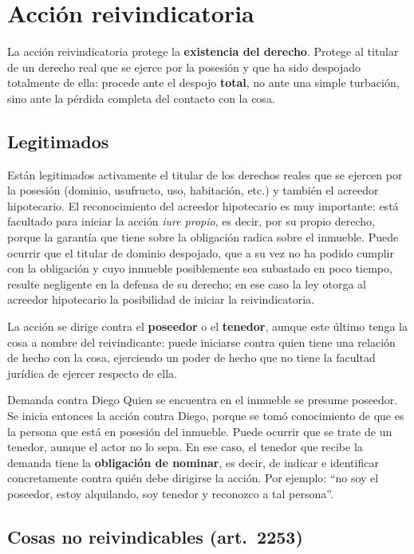 \documentclass[12pt,oneside]{book}
\begin{document}
\section{Acción reivindicatoria}

La acción reivindicatoria protege la \textbf{existencia del derecho}. Protege al titular de un derecho real que se ejerce por la posesión y que ha sido despojado totalmente de ella: procede ante el despojo \textbf{total}, no ante una simple turbación, sino ante la pérdida completa del contacto con la cosa.

\subsection{Legitimados}

Están legitimados activamente el titular de los derechos reales que se ejercen por la posesión (dominio, usufructo, uso, habitación, etc.) y también el acreedor hipotecario. El reconocimiento del acreedor hipotecario es muy importante: está facultado para iniciar la acción \textit{iure propio}, es decir, por su propio derecho, porque la garantía que tiene sobre la obligación radica sobre el inmueble. Puede ocurrir que el titular de dominio despojado, que a su vez no ha podido cumplir con la obligación y cuyo inmueble posiblemente sea subastado en poco tiempo, resulte negligente en la defensa de su derecho; en ese caso la ley otorga al acreedor hipotecario la posibilidad de iniciar la reivindicatoria.

La acción se dirige contra el \textbf{poseedor} o el \textbf{tenedor}, aunque este último tenga la cosa a nombre del reivindicante: puede iniciarse contra quien tiene una relación de hecho con la cosa, ejerciendo un poder de hecho que no tiene la facultad jurídica de ejercer respecto de ella.

\begin{ejemplo}{Demanda contra Diego}
Quien se encuentra en el inmueble se presume poseedor. Se inicia entonces la acción contra Diego, porque se tomó conocimiento de que es la persona que está en posesión del inmueble. Puede ocurrir que se trate de un tenedor, aunque el actor no lo sepa. En ese caso, el tenedor que recibe la demanda tiene la \textbf{obligación de nominar}, es decir, de indicar e identificar concretamente contra quién debe dirigirse la acción. Por ejemplo: ``no soy el poseedor, estoy alquilando, soy tenedor y reconozco a tal persona''.
\end{ejemplo}

\subsection{Cosas no reivindicables (art.~2253)}
\end{document}
